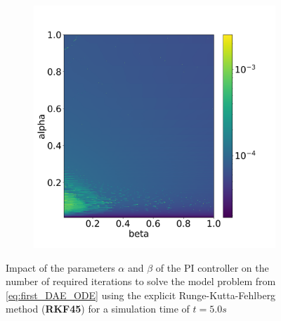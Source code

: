 \documentclass{report}
\begin{document}
\begin{figure}[H]
\begin{subfigure}{0.32\textwidth}
        \label{fig:numberIterationTSRKF45}
    \end{subfigure}
    \begin{subfigure}{0.32\textwidth}
    	\centering
    	\includegraphics[width=1\textwidth]{images/analysis_RKF45_psi.png}
        \label{fig:numberNumericalSchemeRKF45}
    \end{subfigure}
    \caption{Impact of the parameters $\alpha$ and $\beta$ of the PI controller on the number of required iterations to solve the model problem from \autoref{eq:first_DAE_ODE} using the explicit Runge-Kutta-Fehlberg method (\textbf{RKF45}) for a simulation time of $t=5.0s$}
    \label{fig:ParametersPIControllerRKF45}
\end{figure}
\end{document}
